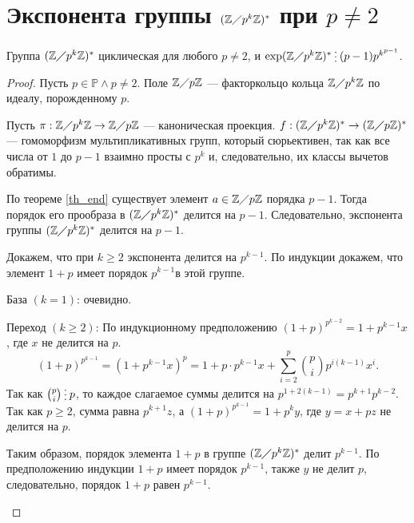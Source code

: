\documentclass[11pt]{book}
\newcommand{\Z}{\mathbb{Z}}
\newcommand{\Pm}{\mathbb{P}}
\newcommand{\po}{\diagup}
\newcommand{\del}{{\:\small \raisebox{-2pt}{\vdots}\:}}
\renewcommand{\ge}{\geqslant}
\theoremstyle{definition}
\theoremstyle{plain}
\theoremstyle{plain}
\theoremstyle{definition}
\theoremstyle{remark}
\begin{document}
 \section{Экспонента группы $ (\Z \po p^{k}\Z)^{*}$ при $ p \ne  2$ }
 \begin{thm}
     Группа $ (\Z \po p^{k }\Z)^{*}$ циклическая для любого $ p \ne 2$, и $ \exp (\Z \po p^{k}\Z)^{*} \del (p-1)p^{k^{p-1}}$. 
 \end{thm}
 \begin{proof}
     Пусть $ p \in \Pm \wedge p \ne  2$. Поле $ \Z \po p\Z$ --- факторкольцо кольца  $ \Z \po p^{k }\Z$ по идеалу, порожденному $ p$.

     Пусть  $ \pi: \Z \po p^{k}\Z \to  \Z \po p\Z$ --- каноническая проекция. $f: (\Z \po p^{k}\Z)^{*} \to  (\Z \po p\Z)^{*}$ --- гомоморфизм мультипликативных групп, который сюрьективен, так как все числа от $ 1$ до $p-1 $ взаимно просты с $ p^{k}$ и, следовательно, их классы вычетов обратимы. 

     По теореме \ref{th_end} существует элемент $ a \in \Z \po p\Z$ порядка $ p-1$. Тогда порядок его прообраза в  $ (\Z \po p^{k}\Z)^{*}$ делится на $ p-1$. Следовательно, экспонента группы  $ (\Z \po p^{k} \Z)^{*}$ делится на $ p-1$.

Докажем, что при $ k \ge 2$ экспонента делится на $ p^{k-1}$.
По индукции докажем, что элемент $ 1+p$ имеет порядок  $ p^{k-1}$в этой группе.
\begin{description}
\item База $ (k=1)$: очевидно.
\item Переход  $ (k \ge 2)$: По индукционному предположению
    $ (1+p)^{p^{k-2}} = 1 + p^{k-1}x$, где $ x$ не делится на  $ p$. 
    \[
	(1+p)^{p^{k-1}} = (1 + p^{k-1} x)^{p} = 1  + p\cdot p^{k-1}x+ \sum_{i=2}^{p} {{p}\choose{i}} p^{i (k-1)} x^{i}
    .\] 
    Так как $ {p \choose i} \del p$, то каждое слагаемое суммы делится на  $ p^{1 + 2(k-1)} = p^{k+1}p^{k-2}$.
    Так как $ p \ge 2$, сумма равна $ p^{k+1}z$, а $ (1+p) ^{p^{k-1}} = 1 + p^{k}y$, где $ y = x + pz$ не делится на  $ p$.

    Таким образом, порядок элемента  $ 1 + p$ в группе  $ (\Z \po p^{k} \Z)^{*}$  делит $ p^{k-1}$. По предположению индукции $ 1+p $ имеет порядок  $ p^{k-1}$, также $ y $ не делит  $ p$, следовательно, порядок  $ 1+p$ равен  $ p^{k-1}$.
\end{description}
 \end{proof}
\end{document}
